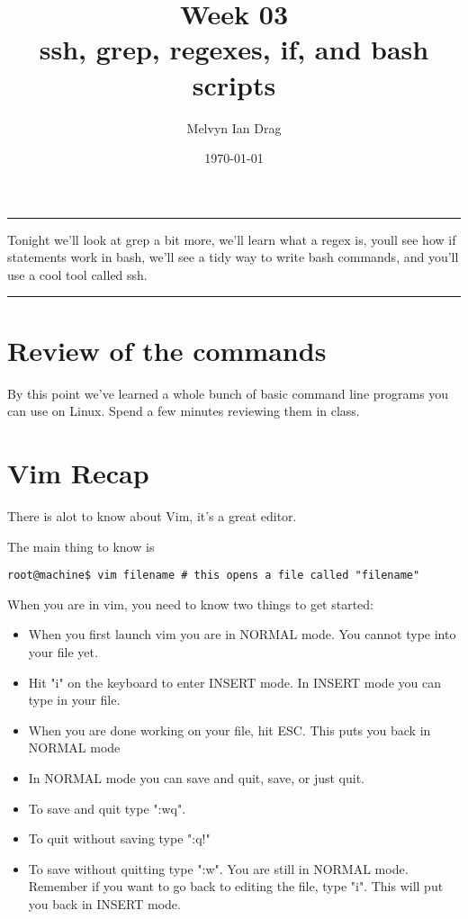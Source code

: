 \documentclass[12pt,a4paper]{article}
\title{\textbf{Week 03} \\
ssh, grep, regexes, if, and bash scripts
}
\author{
	Melvyn Ian Drag
}
\date{\today}
\renewenvironment{abstract}{%
\hfill\begin{minipage}{0.95\textwidth}
\rule{\textwidth}{1pt}}
{\par\noindent\rule{\textwidth}{1pt}\end{minipage}}
\begin{document}
\maketitle

\begin{abstract}
Tonight we'll look at grep a bit more, we'll learn what a regex is, youll see
how if statements work in bash, we'll see a tidy way to write bash commands, and
you'll use a cool tool called ssh.
\end{abstract}

\section{Review of the commands}
By this point we've learned a whole bunch of basic command line programs you
can use on Linux. Spend a few minutes reviewing them in class.

\section{Vim Recap}
There is alot to know about Vim, it's a great editor.

The main thing to know is

\begin{lstlisting}[style=term]
root@machine$ vim filename # this opens a file called "filename"
\end{lstlisting}

When you are in vim, you need to know two things to get started:


\begin{itemize}
\item When you first launch vim you are in NORMAL mode. You cannot type into
your file yet.
\item Hit "i" on the keyboard to enter INSERT mode. In INSERT mode you can type
in your file.
\item When you are done working on your file, hit ESC. This puts you back in
NORMAL mode
\item In NORMAL mode you can save and quit, save, or just quit.
\item To save and quit type ":wq".
\item To quit without saving type ":q!"
\item To save without quitting type ":w". You are still in NORMAL mode. Remember
if you want to go back to editing the file, type "i". This will put you back in
INSERT mode.
\end{itemize}
\end{document}
